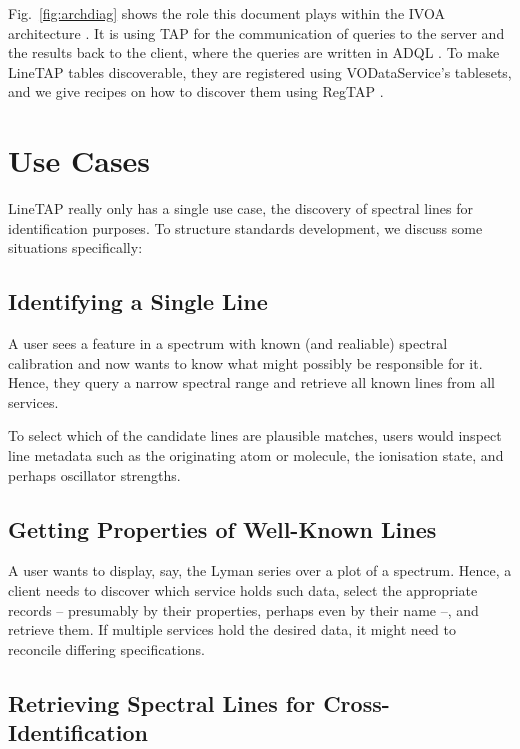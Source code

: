 \documentclass[11pt,a4paper]{ivoa}
\begin{document}
Fig.~\ref{fig:archdiag} shows the role this document plays within the
IVOA architecture \citep{2021ivoa.spec.1101D}.  It is using TAP
\citep{2019ivoa.spec.0927D} for the communication of queries to the
server and the results back to the client, where the queries are written
in ADQL \citep{2008ivoa.spec.1030O}.  To make LineTAP tables
discoverable, they are registered using VODataService's
\citep{2021ivoa.spec.1102D} tablesets, and we give recipes on how to
discover them using RegTAP \citep{2019ivoa.spec.1011D}.


\section{Use Cases}
\label{sect:use-cases}

LineTAP really only has a single use case, the discovery of spectral
lines for identification purposes.  To structure standards development,
we discuss some situations specifically:

\subsection{Identifying a Single Line}

A user sees a feature in a spectrum with known (and realiable) spectral
calibration and now wants to know what might possibly be responsible for
it.  Hence, they query a narrow spectral range and retrieve all known
lines from all services.

To select which of the candidate lines are plausible matches, users
would inspect line metadata such as the originating atom or molecule, the
ionisation state, and perhaps oscillator strengths.

\subsection{Getting Properties of Well-Known Lines}

A user wants to display, say, the Lyman series over a plot of a
spectrum.  Hence, a client needs to discover which service holds such
data, select the appropriate records -- presumably by their properties,
perhaps even by their name --, and retrieve them.  If multiple services
hold the desired data, it might need to reconcile differing
specifications.


\subsection{Retrieving Spectral Lines for Cross-Identification}
\end{document}
